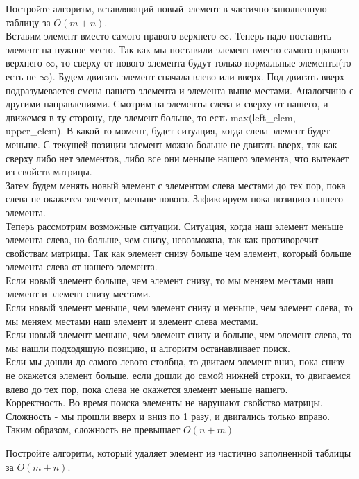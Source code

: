 \documentclass[12pt]{extreport}
\theoremstyle{definiton}
\theoremstyle{definition}
\theoremstyle{definition}
\newcounter{problem}
\newcounter{subproblem}
\def\PRSUBskip{
	\medskip
}
\def\prsub{\PRSUBskip\noindent\stepcounter{subproblem}{\sf \thesubproblem.}\;}
\def\prsubstar{\PRSUBskip\noindent\stepcounter{subproblem}{\rm $\thesubproblem^*$\negthickspace.}\;}
\def\prend{
	\medskip
}
\begin{document}
	 \prsub Постройте алгоритм, вставляющий новый элемент в частично заполненную таблицу за $O(m+n)$.
	 \newline
	 \\ Вставим элемент вместо самого правого верхнего $\infty$. Теперь надо поставить элемент на нужное место. Так как мы поставили элемент вместо самого правого верхнего $\infty$, то сверху от нового элемента будут только нормальные элементы(то есть не $\infty$). Будем двигать элемент сначала влево или вверх. Под двигать вверх подразумевается смена нашего элемента и элемента выше местами. Аналогчино с другими направлениями. Смотрим на элементы слева и сверху от нашего, и движемся в ту сторону, где элемент больше, то есть max(left\_elem, upper\_elem). В какой-то момент, будет ситуация, когда слева элемент будет меньше. С текущей позиции элемент можно больше не двигать вверх, так как сверху либо нет элементов, либо все они меньше нашего элемента, что вытекает из свойств матрицы.
	 \\ Затем будем менять новый элемент с элементом слева местами до тех пор, пока слева не окажется элемент, меньше нового. Зафиксируем пока позицию нашего элемента.
	 \\ Теперь рассмотрим возможные ситуации. Ситуация, когда наш элемент меньше элемента слева, но больше, чем снизу, невозможна, так как противоречит свойствам матрицы. Так как элемент снизу больше чем элемент, который больше элемента слева от нашего элемента.
	 \\Если новый элемент больше, чем элемент снизу, то мы меняем местами наш элемент и элемент снизу местами.
	 \\ Если новый элемент меньше, чем элемент снизу и меньше, чем элемент слева, то мы меняем местами наш элемент и элемент слева местами.
	 \\ Если новый элемент меньше, чем элемент снизу и больше, чем элемент слева, то мы нашли подходящую позицию, и алгоритм останавливает поиск.
	 \\ Если мы дошли до самого левого столбца, то двигаем элемент вниз, пока снизу не окажется элемент больше, если дошли до самой нижней строки, то двигаемся влево до тех пор, пока слева не окажется элемент меньше нашего.
	 \\Корректность. Во время поиска элементы не нарушают свойство матрицы.
	 \\ Сложность - мы прошли вверх и вниз по 1 разу, и двигались только вправо. Таким образом, сложность не превышает $O(n+m)$
	 

	 \prsubstar Постройте алгоритм, который удаляет элемент из частично заполненной таблицы за \mbox{$O(m+n)$}.

	 \prend
			
			
\end{document}
